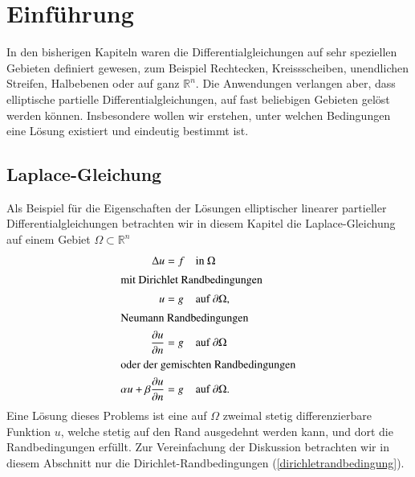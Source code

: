 %
%
%
\section{Einführung}
In den bisherigen Kapiteln waren die Differentialgleichungen auf sehr
speziellen Gebieten definiert gewesen, zum Beispiel Rechtecken, Kreissscheiben,
unendlichen Streifen, Halbebenen oder auf ganz $\mathbb R^n$. 
Die Anwendungen verlangen aber, dass elliptische partielle
Differentialgleichungen, auf fast beliebigen Gebieten gelöst werden können.
Insbesondere wollen wir erstehen, unter welchen Bedingungen eine
Lösung existiert und eindeutig bestimmt ist.

\subsection{Laplace-Gleichung}
Als Beispiel für die Eigenschaften der Lösungen
elliptischer linearer partieller Differentialgleichungen
betrachten wir in diesem Kapitel die Laplace-Gleichung
auf einem Gebiet $\Omega\subset\mathbb R^n$
\begin{align}
\Delta u&=f &&\text{in $\Omega$}
\label{elliptisch:laplaceequation}
\\
\intertext{mit Dirichlet Randbedingungen}
u&=g && \text{auf $\partial\Omega$},
\label{dirichletrandbedingung}
\\
\intertext{Neumann Randbedingungen}
\frac{\partial u}{\partial n}&=g && \text{auf $\partial\Omega$}
\\
\intertext{oder der gemischten Randbedingungen}
\alpha u + \beta\frac{\partial u}{\partial n}&=g && \text{auf $\partial\Omega$.}
\label{elliptisch:gemischt}
\end{align}
Eine Lösung dieses Problems ist eine auf $\Omega$
zweimal stetig differenzierbare
Funktion $u$, welche stetig auf den Rand ausgedehnt werden kann,
und dort die Randbedingungen erfüllt. Zur Vereinfachung der
Diskussion betrachten wir in diesem Abschnitt nur die
Dirichlet-Randbedingungen (\ref{dirichletrandbedingung}).

